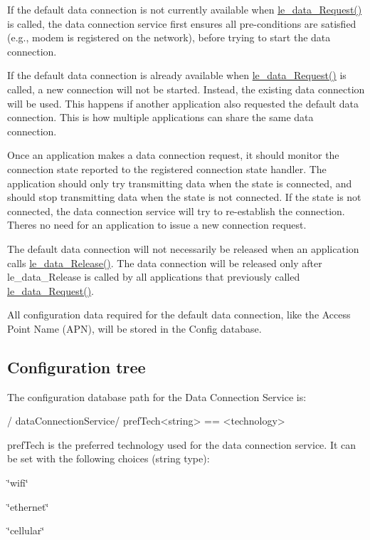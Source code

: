 If the default data connection is not currently available when \hyperlink{le__data__interface_8h_afb9db0acdd98620cb0cd303bee8a817c}{le\+\_\+data\+\_\+\+Request()} is called, the data connection service first ensures all pre-\/conditions are satisfied (e.\+g., modem is registered on the network), before trying to start the data connection.

If the default data connection is already available when \hyperlink{le__data__interface_8h_afb9db0acdd98620cb0cd303bee8a817c}{le\+\_\+data\+\_\+\+Request()} is called, a new connection will not be started. Instead, the existing data connection will be used. This happens if another application also requested the default data connection. This is how multiple applications can share the same data connection.

Once an application makes a data connection request, it should monitor the connection state reported to the registered connection state handler. The application should only try transmitting data when the state is connected, and should stop transmitting data when the state is not connected. If the state is not connected, the data connection service will try to re-\/establish the connection. There\textquotesingle{}s no need for an application to issue a new connection request.

The default data connection will not necessarily be released when an application calls \hyperlink{le__data__interface_8h_a1dc7cd8faed6b1ee02ea947cf02b8ee7}{le\+\_\+data\+\_\+\+Release()}. The data connection will be released only after le\+\_\+data\+\_\+\+Release is called by all applications that previously called \hyperlink{le__data__interface_8h_afb9db0acdd98620cb0cd303bee8a817c}{le\+\_\+data\+\_\+\+Request()}.

All configuration data required for the default data connection, like the Access Point Name (A\+P\+N), will be stored in the Config database.\hypertarget{c_le_data_c_le_data_configdb}{}\subsection{Configuration tree}\label{c_le_data_c_le_data_configdb}
The configuration database path for the Data Connection Service is\+: \begin{DoxyVerb} /
     dataConnectionService/
         prefTech<string> == <technology>\end{DoxyVerb}


\textquotesingle{}pref\+Tech\textquotesingle{} is the preferred technology used for the data connection service. It can be set with the following choices (string type)\+:
\begin{DoxyItemize}
\item \char`\"{}wifi\char`\"{}
\item \char`\"{}ethernet\char`\"{}
\item \char`\"{}cellular\char`\"{}
\end{DoxyItemize}

